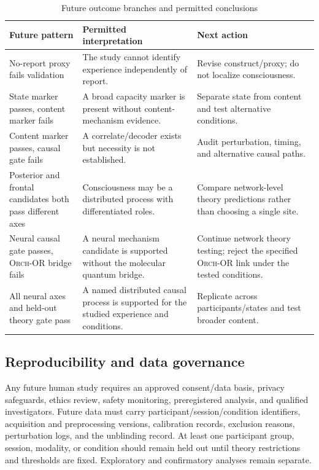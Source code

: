 \documentclass[conference]{IEEEtran}
\newcommand{\ORCH}{\textsc{Orch-OR}}
\begin{document}
\begin{table}[t]
\caption{Future outcome branches and permitted conclusions}
\label{tab:branches}
\centering
\footnotesize
\begin{tabular}{p{} p{} p{}}
\toprule
\textbf{Future pattern} & \textbf{Permitted interpretation} & \textbf{Next action}\\
\midrule
No-report proxy fails validation & The study cannot identify experience independently of report. & Revise construct/proxy; do not localize consciousness.\\
State marker passes, content marker fails & A broad capacity marker is present without content-mechanism evidence. & Separate state from content and test alternative conditions.\\
Content marker passes, causal gate fails & A correlate/decoder exists but necessity is not established. & Audit perturbation, timing, and alternative causal paths.\\
Posterior and frontal candidates both pass different axes & Consciousness may be a distributed process with differentiated roles. & Compare network-level theory predictions rather than choosing a single site.\\
Neural causal gate passes, \ORCH{} bridge fails & A neural mechanism candidate is supported without the molecular quantum bridge. & Continue network theory testing; reject the specified \ORCH{} link under the tested conditions.\\
All neural axes and held-out theory gate pass & A named distributed causal process is supported for the studied experience and conditions. & Replicate across participants/states and test broader content.\\
\bottomrule
\end{tabular}
\end{table}

\subsection{Reproducibility and data governance}

Any future human study requires an approved consent/data basis, privacy safeguards, ethics review, safety monitoring, preregistered analysis, and qualified investigators. Future data must carry participant/session/condition identifiers, acquisition and preprocessing versions, calibration records, exclusion reasons, perturbation logs, and the unblinding record. At least one participant group, session, modality, or condition should remain held out until theory restrictions and thresholds are fixed. Exploratory and confirmatory analyses remain separate.
\end{document}
